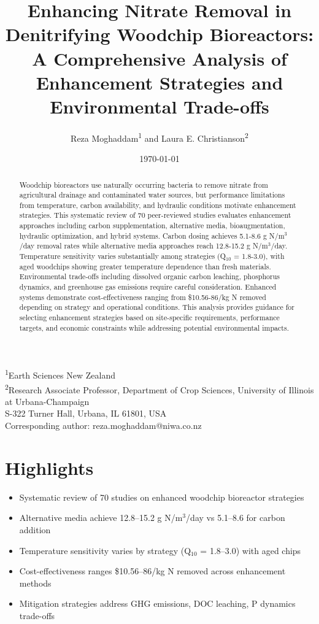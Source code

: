 \documentclass[12pt,a4paper]{article}
\title{Enhancing Nitrate Removal in Denitrifying Woodchip Bioreactors: A Comprehensive Analysis of Enhancement Strategies and Environmental Trade-offs}
\author{Reza Moghaddam\textsuperscript{1} and Laura E. Christianson\textsuperscript{2}}
\date{\today}
\begin{document}
\maketitle

\begin{center}
\footnotesize
\textsuperscript{1}Earth Sciences New Zealand\\
\textsuperscript{2}Research Associate Professor, Department of Crop Sciences, University of Illinois at Urbana-Champaign\\
S-322 Turner Hall, Urbana, IL 61801, USA\\
Corresponding author: reza.moghaddam@niwa.co.nz
\end{center}

\begin{abstract}
Woodchip bioreactors use naturally occurring bacteria to remove nitrate from agricultural drainage and contaminated water sources, but performance limitations from temperature, carbon availability, and hydraulic conditions motivate enhancement strategies. This systematic review of 70 peer-reviewed studies evaluates enhancement approaches including carbon supplementation, alternative media, bioaugmentation, hydraulic optimization, and hybrid systems. Carbon dosing achieves 5.1-8.6 g N/m$^3$/day removal rates while alternative media approaches reach 12.8-15.2 g N/m$^3$/day. Temperature sensitivity varies substantially among strategies (Q$_{10}$ = 1.8-3.0), with aged woodchips showing greater temperature dependence than fresh materials. Environmental trade-offs including dissolved organic carbon leaching, phosphorus dynamics, and greenhouse gas emissions require careful consideration. Enhanced systems demonstrate cost-effectiveness ranging from \$10.56-86/kg N removed depending on strategy and operational conditions. This analysis provides guidance for selecting enhancement strategies based on site-specific requirements, performance targets, and economic constraints while addressing potential environmental impacts.
\end{abstract}

\section*{Highlights}

\begin{itemize}[leftmargin=*, itemsep=0.2em]
\item Systematic review of 70 studies on enhanced woodchip bioreactor strategies
\item Alternative media achieve 12.8--15.2 g N/m$^3$/day vs 5.1--8.6 for carbon addition
\item Temperature sensitivity varies by strategy (Q$_{10}$ = 1.8--3.0) with aged chips
\item Cost-effectiveness ranges \$10.56--86/kg N removed across enhancement methods
\item Mitigation strategies address GHG emissions, DOC leaching, P dynamics trade-offs
\end{itemize}
\end{document}
